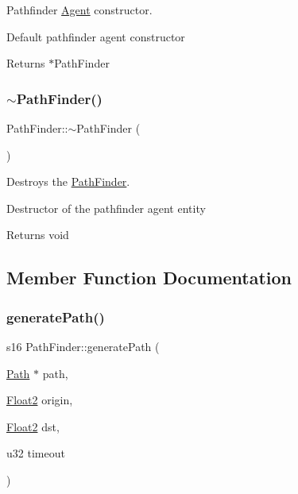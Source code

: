 Pathfinder \mbox{\hyperlink{class_agent}{Agent}} constructor. 

Default pathfinder agent constructor

\begin{DoxyReturn}{Returns}
$\ast$\+Path\+Finder 
\end{DoxyReturn}
\mbox{\label{class_path_finder_acc04bc8bcddfda54da6a2905b256cf90}} 
\subsubsection{\texorpdfstring{$\sim$\+Path\+Finder()}{~PathFinder()}}
{\footnotesize\ttfamily Path\+Finder\+::$\sim$\+Path\+Finder (\begin{DoxyParamCaption}{ }\end{DoxyParamCaption})}



Destroys the \mbox{\hyperlink{class_path_finder}{Path\+Finder}}. 

Destructor of the pathfinder agent entity

\begin{DoxyReturn}{Returns}
void 
\end{DoxyReturn}


\subsection{Member Function Documentation}
\mbox{\label{class_path_finder_ae1c25582d9f8c1ee73d5adc780a14e9c}} 
\subsubsection{\texorpdfstring{generate\+Path()}{generatePath()}\hspace{0.1cm}{\footnotesize\ttfamily [1/2]}}
{\footnotesize\ttfamily s16 Path\+Finder\+::generate\+Path (\begin{DoxyParamCaption}\item[{\mbox{\hyperlink{class_path}{Path}} $\ast$}]{path,  }\item[{\mbox{\hyperlink{class_float2}{Float2}}}]{origin,  }\item[{\mbox{\hyperlink{class_float2}{Float2}}}]{dst,  }\item[{u32}]{timeout }\end{DoxyParamCaption})}



